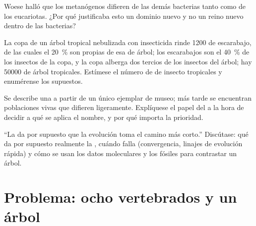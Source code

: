 \begin{exercise}[$\star\star$]\label{exo:b1:classifying-biodiversity:9}
Woese halló que los metanógenos difieren de las demás bacterias tanto como
de los eucariotas. ¿Por qué justificaba esto un dominio nuevo y no un reino
nuevo dentro de las bacterias?
\end{exercise}

\begin{exercise}[$\star\star\star$]\label{exo:b1:classifying-biodiversity:10}
La copa de un árbol tropical nebulizada con insecticida rinde 1200 
de escarabajo, de las cuales el \qty{20}{\%} son propias de esa  de
árbol; los escarabajos son el \qty{40}{\%} de los insectos de la copa, y la
copa alberga dos tercios de los insectos del árbol; hay \num{50000} 
de árbol tropicales. Estímese el número de  de insecto tropicales y
enumérense los supuestos.
\end{exercise}

\begin{exercise}[$\star\star\star$]\label{exo:b1:classifying-biodiversity:11}
Se describe una  a partir de un único ejemplar de museo; más tarde se
encuentran poblaciones vivas que difieren ligeramente. Explíquese el papel
del  a la hora de decidir a qué se aplica el nombre, y por qué
importa la prioridad.
\end{exercise}

\begin{exercise}[$\star\star\star$]\label{exo:b1:classifying-biodiversity:12}
``La  da por supuesto que la evolución toma el camino más corto.''
Discútase: qué da por supuesto realmente la , cuándo falla
(convergencia, linajes de evolución rápida) y cómo se usan los datos
moleculares y los fósiles para contrastar un árbol.
\end{exercise}

\section{Problema: ocho vertebrados y un árbol}

